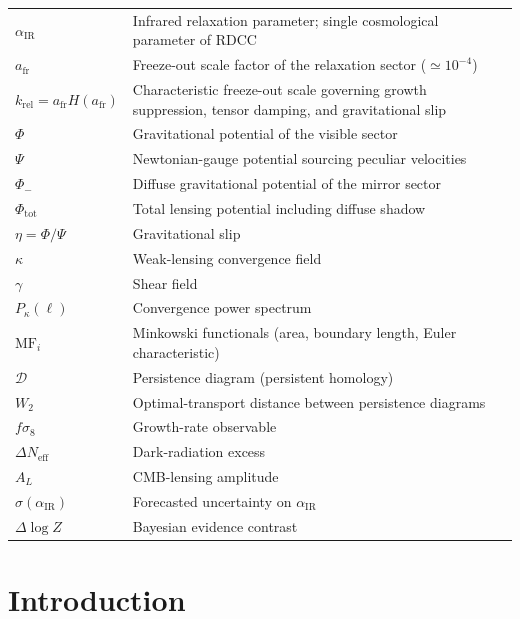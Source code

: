 \documentclass[11pt,a4paper]{article}
\begin{document}
\begin{tabular}{ll}
\(\alpha_{\mathrm{IR}}\) & Infrared relaxation parameter; single cosmological
parameter of RDCC \\[4pt]
\(a_{\mathrm{fr}}\) & Freeze-out scale factor of the relaxation sector
(\(\simeq 10^{-4}\)) \\[4pt]
\(k_{\mathrm{rel}}=a_{\mathrm{fr}}H(a_{\mathrm{fr}})\) &
Characteristic freeze-out scale governing growth suppression,
tensor damping, and gravitational slip \\[4pt]
\(\Phi\) & Gravitational potential of the visible sector \\[4pt]
\(\Psi\) & Newtonian-gauge potential sourcing peculiar velocities \\[4pt]
\(\Phi_{-}\) & Diffuse gravitational potential of the mirror sector \\[4pt]
\(\Phi_{\mathrm{tot}}\) & Total lensing potential including diffuse shadow \\[4pt]
\(\eta=\Phi/\Psi\) & Gravitational slip \\[4pt]
\(\kappa\) & Weak-lensing convergence field \\[4pt]
\(\gamma\) & Shear field \\[4pt]
\(P_{\kappa}(\ell)\) & Convergence power spectrum \\[4pt]
\(\mathrm{MF}_{i}\) & Minkowski functionals (area, boundary length,
Euler characteristic) \\[4pt]
\(\mathcal{D}\) & Persistence diagram (persistent homology) \\[4pt]
\(W_{2}\) & Optimal-transport distance between persistence diagrams \\[4pt]
\(f\sigma_8\) & Growth-rate observable \\[4pt]
\(\Delta N_{\mathrm{eff}}\) & Dark-radiation excess \\[4pt]
\(A_L\) & CMB-lensing amplitude \\[4pt]
\(\sigma(\alpha_{\mathrm{IR}})\) & Forecasted uncertainty on
\(\alpha_{\mathrm{IR}}\) \\[4pt]
\(\Delta\log Z\) & Bayesian evidence contrast \\[4pt]
\end{tabular}


\section{Introduction}
\end{document}
